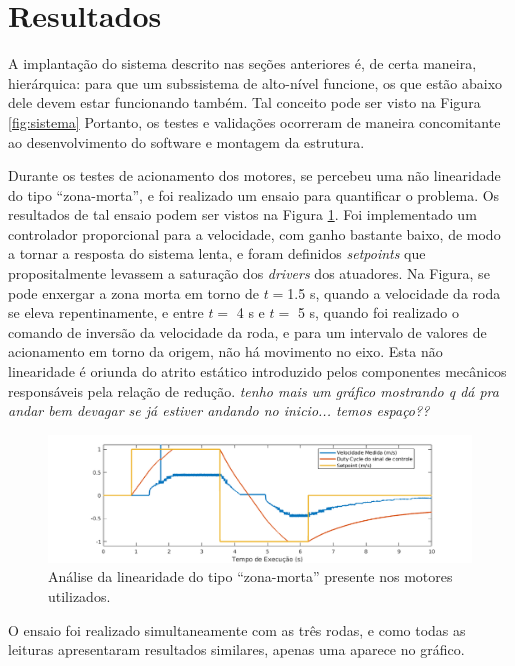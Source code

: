 \section{Resultados}
\label{sec:resultados}

A implantação do sistema descrito nas seções anteriores é, de certa maneira, hierárquica: para que um subssistema de alto-nível funcione, os que estão abaixo dele devem estar funcionando também. Tal conceito pode ser visto na Figura \ref{fig:sistema} Portanto, os testes e validações ocorreram de maneira concomitante ao desenvolvimento do software e montagem da estrutura.

Durante os testes de acionamento dos motores, se percebeu uma não linearidade do tipo ``zona-morta'', e foi realizado um ensaio para quantificar o problema. Os resultados de tal ensaio podem ser vistos na Figura \ref{fig:zonamorta}. Foi implementado um controlador proporcional para a velocidade, com ganho bastante baixo, de modo a tornar a resposta do sistema lenta, e foram definidos \emph{setpoints} que propositalmente levassem a saturação dos \textit{drivers} dos atuadores. Na Figura, se pode enxergar a zona morta em torno de $t=$1.5 s, quando a velocidade da roda se eleva repentinamente, e entre $t=$ 4 s e $t=$ 5 s, quando foi realizado o comando de inversão da velocidade da roda, e para um intervalo de valores de acionamento em torno da origem, não há movimento no eixo. Esta não linearidade é oriunda do atrito estático introduzido pelos componentes mecânicos responsáveis pela relação de redução. \textit{tenho mais um gráfico mostrando q dá pra andar bem devagar se já estiver andando no inicio... temos espaço??}

\begin{figure}[h]
  \centering
  \includegraphics[width = \textwidth]{imagens/zonamorta}
  \caption{Análise da linearidade do tipo ``zona-morta'' presente nos motores utilizados.}
  \label{fig:zonamorta}
\end{figure}

O ensaio foi realizado simultaneamente com as três rodas, e como todas as leituras apresentaram resultados similares, apenas uma aparece no gráfico.

